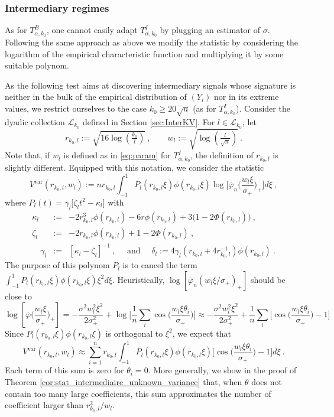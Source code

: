 \documentclass[twoside,11pt]{article}
\def\beq{\begin{equation}}
\def\eeq{\end{equation}}
\def\cL{\mathcal{L}}
\newcommand{\<}{\langle}
\renewcommand{\>}{\rangle}
\begin{document}
\subsubsection{Intermediary regimes}


As for $T^{B}_{\alpha,k_0}$, one cannot easily adapt $T^{I}_{\alpha,k_0}$ by plugging an estimator of $\sigma$. Following the same approach as above we modify the statistic by considering the logarithm of the empirical characteristic function and multiplying it by some suitable polynom. 


As the following test aims at discovering intermediary signals whose signature is neither in the bulk of the empirical distribution of $(Y_{i})$ nor in its extreme values, we restrict ourselves to the case  $k_0\geq 20\sqrt{n}$ (as for $T^{I}_{\alpha,k_0}$). Consider the dyadic collection $\mathcal{L}_{k_0}$ defined in Section \ref{sec:InterKV}. For $l\in \cL_{k_0}$, let 
 \beq \label{eq:paramUV}
  r_{k_0,l}:=\sqrt{16\log(\tfrac{k_0}{l})}\ ,\quad \quad w_l := \sqrt{\log(\tfrac{l}{\sqrt{n}})}\ .
\eeq
Note that, if $w_l$ is defined  as  in \eqref{eq:param} for $T^{I}_{\alpha,k_0}$, the definition of $r_{k_0,l}$ is slightly different.
Equipped with this notation, we consider the statistic
\beq\label{eq:def_eta_alt2_log}
V^{\mathrm{var}}(r_{k_0,l},w_l) :=   n r_{k_0,l} \int_{-1}^{1} P_l(r_{k_0,l}\xi) \phi(r_{k_0,l}\xi) \log\big[\overline{\varphi}_n\big(\frac{w_l\xi}{\sigma_+}\big)_+\big] d\xi\ ,
\eeq
where $P_l(t)=\gamma_l \big[\zeta_l t^2  - \kappa_l\big] $ with 
\begin{eqnarray} \label{eq:param_s}
\kappa_l&:=& -2r_{k_0,l}^3\phi(r_{k_0,l}) - 6r \phi(r_{k_0,l})+ 3\big(1- 2\Phi(r_{k_0,l})\big)\ ,\\ \zeta_l&:=& -2r_{k_0,l}\phi(r_{k_0,l}) + 1 - 2 \Phi(r_{k_0,l})\ , \nonumber\\
\quad 
\gamma_l &:= &[\kappa_l - \zeta_l]^{-1} \ , \quad \text{ and }\quad \delta_l := 4\gamma_l (r_{k_0,l} +4r_{k_0,l}^{-1})\phi(r_{k_0,l})\ . \nonumber
\end{eqnarray}
The purpose of this polynom $P_l$ is to cancel the  term $\int_{-1}^{1} P_l(r_{k_0,l}\xi) \phi(r_{k_0,l}\xi)\xi^2 d\xi$. Heuristically, $\log[\overline{\varphi}_n(w_l\xi/\sigma_+)_+]$ should be close to 
\[\log[\overline{\varphi}\big(\frac{w_l\xi}{\sigma_+}\big)_+]= -\frac{\sigma^2w_l^2\xi^2}{2\sigma_+^2} + \log\big[\frac{1}{n}\sum_{i}\cos\big(\frac{w_l\xi\theta_i}{\sigma_+}\big)\big]\approx  -\frac{\sigma^2w_l^2\xi^2}{2\sigma_+^2} + \frac{1}{n}\sum_{i}\big[\cos\big(\frac{w_l\xi\theta_i}{\sigma_+}\big)-1\big]\]
Since $P_l(r_{k_0,l}\xi) \phi(r_{k_0,l}\xi)$ is orthogonal to $\xi^2$, we expect that 
\[
 V^{\mathrm{var}}(r_{k_0,l},w_l)\approx \sum_{i=1}^n r_{k_0,l} \int_{-1}^{1} P_l(r_{k_0,l}\xi) \phi(r_{k_0,l}\xi) \big[\cos\big(\frac{w_l\xi\theta_i}{\sigma_+}\big)-1\big] d\xi\ . 
\]
Each term of this sum is zero for $\theta_i=0$. More generally, we show in the proof of Theorem \ref{cor:stat_intermediaire_unknown_variance} that, when $\theta$ does not contain too many large coefficients, this sum approximates the number of coefficient larger than $r_{k_0,l}^2/w_l$. 
\end{document}
